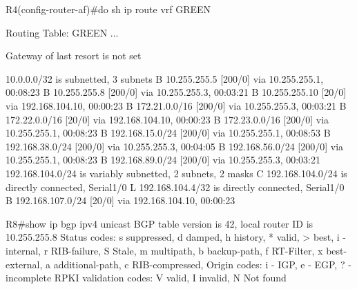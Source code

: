 \documentclass[12pt,twoside,a4paper]{report}
\begin{document}
R4(config-router-af)#do sh ip route vrf GREEN

Routing Table: GREEN
...

Gateway of last resort is not set

      10.0.0.0/32 is subnetted, 3 subnets
B        10.255.255.5 [200/0] via 10.255.255.1, 00:08:23
B        10.255.255.8 [200/0] via 10.255.255.3, 00:03:21
B        10.255.255.10 [20/0] via 192.168.104.10, 00:00:23
B     172.21.0.0/16 [200/0] via 10.255.255.3, 00:03:21
B     172.22.0.0/16 [20/0] via 192.168.104.10, 00:00:23
B     172.23.0.0/16 [200/0] via 10.255.255.1, 00:08:23
B     192.168.15.0/24 [200/0] via 10.255.255.1, 00:08:53
B     192.168.38.0/24 [200/0] via 10.255.255.3, 00:04:05
B     192.168.56.0/24 [200/0] via 10.255.255.1, 00:08:23
B     192.168.89.0/24 [200/0] via 10.255.255.3, 00:03:21
      192.168.104.0/24 is variably subnetted, 2 subnets, 2 masks
C        192.168.104.0/24 is directly connected, Serial1/0
L        192.168.104.4/32 is directly connected, Serial1/0
B     192.168.107.0/24 [20/0] via 192.168.104.10, 00:00:23





R8#show ip bgp ipv4 unicast 
BGP table version is 42, local router ID is 10.255.255.8
Status codes: s suppressed, d damped, h history, * valid, > best, i - internal, 
              r RIB-failure, S Stale, m multipath, b backup-path, f RT-Filter, 
              x best-external, a additional-path, c RIB-compressed, 
Origin codes: i - IGP, e - EGP, ? - incomplete
RPKI validation codes: V valid, I invalid, N Not found
\end{document}
